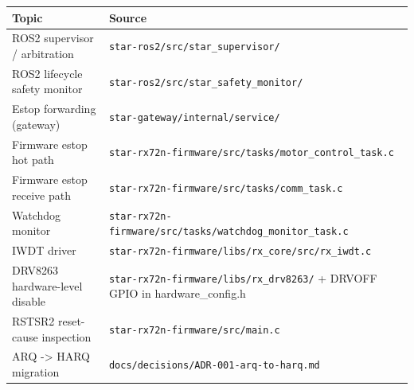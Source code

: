 \begin{center}
\begin{tabular}{|p{5.0cm}|p{9.0cm}|}
\hline
\textbf{Topic}                                  & \textbf{Source}                                                                                              \\
\hline
ROS2 supervisor / arbitration                    & \texttt{star-ros2/src/star\_supervisor/}                                                                     \\
ROS2 lifecycle safety monitor                    & \texttt{star-ros2/src/star\_safety\_monitor/}                                                                \\
Estop forwarding (gateway)                       & \texttt{star-gateway/internal/service/}                                                                       \\
Firmware estop hot path                          & \texttt{star-rx72n-firmware/src/tasks/motor\_control\_task.c}                                                 \\
Firmware estop receive path                      & \texttt{star-rx72n-firmware/src/tasks/comm\_task.c}                                                           \\
Watchdog monitor                                  & \texttt{star-rx72n-firmware/src/tasks/watchdog\_monitor\_task.c}                                              \\
IWDT driver                                       & \texttt{star-rx72n-firmware/libs/rx\_core/src/rx\_iwdt.c}                                                     \\
DRV8263 hardware-level disable                   & \texttt{star-rx72n-firmware/libs/rx\_drv8263/} + DRVOFF GPIO in hardware\_config.h                            \\
RSTSR2 reset-cause inspection                    & \texttt{star-rx72n-firmware/src/main.c}                                                                       \\
ARQ -> HARQ migration                            & \texttt{docs/decisions/ADR-001-arq-to-harq.md}                                                                \\
\hline
\end{tabular}
\end{center}
